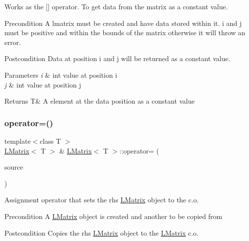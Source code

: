 Works as the \mbox{[}\mbox{]} operator. To get data from the matrix as a constant value. 

\begin{DoxyPrecond}{Precondition}
A lmatrix must be created and have data stored within it. i and j must be positive and within the bounds of the matrix otherwise it will throw an error. 
\end{DoxyPrecond}
\begin{DoxyPostcond}{Postcondition}
Data at position i and j will be returned as a constant value.
\end{DoxyPostcond}

\begin{DoxyParams}{Parameters}
{\em i} & int value at position i \\
\hline
{\em j} & int value at position j \\
\hline
\end{DoxyParams}
\begin{DoxyReturn}{Returns}
T\& A element at the data position as a constant value 
\end{DoxyReturn}
\mbox{\label{class_l_matrix_ad4feb8e3706e9ce8fdb07e63d985f52f}} 
\subsubsection{\texorpdfstring{operator=()}{operator=()}}
{\footnotesize\ttfamily template$<$class T $>$ \\
\mbox{\hyperlink{class_l_matrix}{L\+Matrix}}$<$ T $>$ \& \mbox{\hyperlink{class_l_matrix}{L\+Matrix}}$<$ T $>$\+::operator= (\begin{DoxyParamCaption}\item[{const \mbox{\hyperlink{class_l_matrix}{L\+Matrix}}$<$ T $>$ \&}]{source }\end{DoxyParamCaption})\hspace{0.3cm}{\ttfamily [virtual]}}



Assignment operator that sets the rhs \mbox{\hyperlink{class_l_matrix}{L\+Matrix}} object to the c.\+o. 

\begin{DoxyPrecond}{Precondition}
A \mbox{\hyperlink{class_l_matrix}{L\+Matrix}} object is created and another to be copied from 
\end{DoxyPrecond}
\begin{DoxyPostcond}{Postcondition}
Copies the rhs \mbox{\hyperlink{class_l_matrix}{L\+Matrix}} object to the \mbox{\hyperlink{class_l_matrix}{L\+Matrix}} c.\+o. 
\end{DoxyPostcond}

